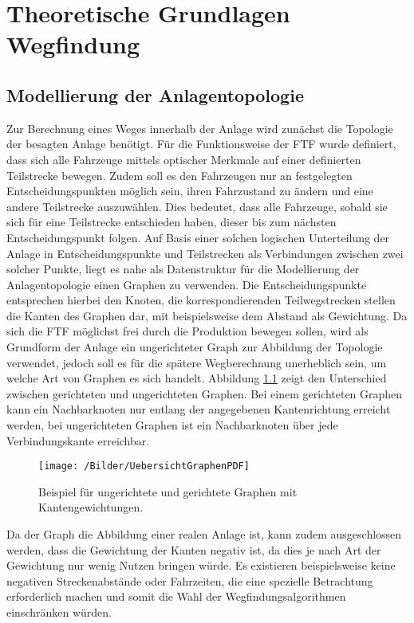 \chapter{Theoretische Grundlagen Wegfindung}
	\label{Theorie}
\section{Modellierung der Anlagentopologie}
	\label{Graph_Anlage}
	Zur Berechnung eines Weges innerhalb der Anlage wird zunächst die Topologie der besagten Anlage benötigt. Für die Funktionsweise der \ac{FTF} wurde definiert, dass sich alle Fahrzeuge mittels optischer Merkmale auf einer definierten Teilstrecke bewegen. Zudem soll es den Fahrzeugen nur an festgelegten Entscheidungspunkten möglich sein, ihren Fahrzustand zu ändern und eine andere Teilstrecke auszuwählen. Dies bedeutet, dass alle Fahrzeuge, sobald sie sich für eine Teilstrecke entschieden haben, dieser bis zum nächsten Entscheidungspunkt folgen. Auf Basis einer solchen logischen Unterteilung der Anlage in Entscheidungspunkte und Teilstrecken als Verbindungen zwischen zwei solcher Punkte, liegt es nahe als Datenstruktur für die Modellierung der Anlagentopologie einen Graphen zu verwenden. Die Entscheidungspunkte entsprechen hierbei den Knoten, die korrespondierenden Teilwegstrecken stellen die Kanten des Graphen dar, mit beispielsweise dem Abstand als Gewichtung. Da sich die \ac{FTF} möglichst frei durch die Produktion bewegen sollen, wird als Grundform der Anlage ein ungerichteter Graph zur Abbildung der Topologie verwendet, jedoch soll es für die spätere Wegberechnung unerheblich sein, um welche Art von Graphen es sich handelt. Abbildung \ref{GraphenUebersicht} zeigt den Unterschied zwischen gerichteten und ungerichteten Graphen. Bei einem gerichteten Graphen kann ein Nachbarknoten nur entlang der angegebenen Kantenrichtung erreicht werden, bei ungerichteten Graphen ist ein Nachbarknoten über jede Verbindungskante erreichbar.

	\begin{figure}
		\centering
		\texttt{[image: /Bilder/UebersichtGraphenPDF]}
		\vspace{0.2cm}
		\caption{Beispiel für ungerichtete und gerichtete Graphen mit Kantengewichtungen.}\label{GraphenUebersicht}
	\end{figure}

	Da der Graph die Abbildung einer realen Anlage ist, kann zudem ausgeschlossen werden, dass die Gewichtung der Kanten negativ ist, da dies je nach Art der Gewichtung nur wenig Nutzen bringen würde. Es existieren beispielsweise keine negativen Streckenabstände oder Fahrzeiten, die eine spezielle Betrachtung erforderlich machen und somit die Wahl der Wegfindungsalgorithmen einschränken würden.
	
